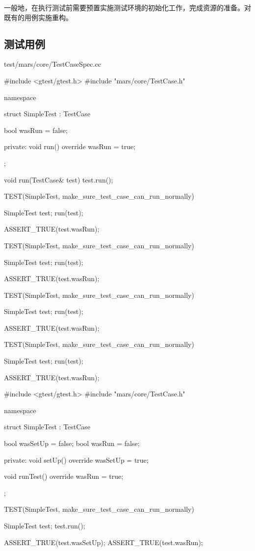 \begin{content}

一般地，在执行测试前需要预置实施测试环境的初始化工作，完成资源的准备。对既有的用例实施重构。

\subsection{测试用例}

\begin{diff}{test/mars/core/TestCaseSpec.cc}
 \begin{c++}
#include <gtest/gtest.h>
#include "mars/core/TestCase.h"

namespace {
  struct SimpleTest : TestCase {
    bool wasRun = false;

  private:
    void run() override {
      wasRun = true;
    }
  };

  void run(TestCase& test) {
    test.run();
  }
}

TEST(SimpleTest, make_sure_test_case_can_run_normally) {
  SimpleTest test;
  run(test);

  ASSERT_TRUE(test.wasRun);
}

TEST(SimpleTest, make_sure_test_case_can_run_normally) {
  SimpleTest test;
  run(test);

  ASSERT_TRUE(test.wasRun);
}

TEST(SimpleTest, make_sure_test_case_can_run_normally) {
  SimpleTest test;
  run(test);

  ASSERT_TRUE(test.wasRun);
}

TEST(SimpleTest, make_sure_test_case_can_run_normally) {
  SimpleTest test;
  run(test);

  ASSERT_TRUE(test.wasRun);
}
 \end{c++}
\tcblower
 \begin{c++}
#include <gtest/gtest.h>
#include "mars/core/TestCase.h"

namespace {
  struct SimpleTest : TestCase {
    bool wasSetUp = false;
    bool wasRun = false;

  private:
    void setUp() override {
      wasSetUp = true;
    }

    void runTest() override {
      wasRun = true;
    }
  };
}

TEST(SimpleTest, make_sure_test_case_can_run_normally) {
  SimpleTest test;
  test.run();

  ASSERT_TRUE(test.wasSetUp);
  ASSERT_TRUE(test.wasRun);
}
 \end{c++} 
\end{diff}


\end{content}
